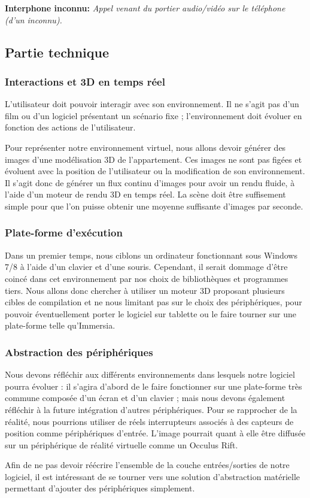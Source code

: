 \textbf{Interphone inconnu: } \textit{Appel venant du portier audio/vidéo sur le téléphone (d'un inconnu). }

\subsection{Partie technique}
\subsubsection{Interactions et 3D en temps réel}
L'utilisateur doit pouvoir interagir avec son environnement. Il ne s'agit pas d'un film ou d'un logiciel présentant un scénario fixe ; l'environnement doit évoluer en fonction des actions de l'utilisateur.

Pour représenter notre environnement virtuel, nous allons devoir générer des images d'une modélisation 3D de l'appartement. Ces images ne sont pas figées et évoluent avec la position de l'utilisateur ou la modification de son environnement. Il s'agit donc de générer un flux continu d'images pour avoir un rendu fluide, à l'aide d'un moteur de rendu 3D en temps réel. La scène doit être suffisement simple pour que l'on puisse obtenir une moyenne suffisante d'images par seconde.

\subsubsection{Plate-forme d'exécution}

Dans un premier temps, nous ciblons un ordinateur fonctionnant sous Windows 7/8 à l'aide d'un clavier et d'une souris. Cependant, il serait dommage d'être coincé dans cet environnement par nos choix de bibliothèques et programmes tiers. Nous allons donc chercher à utiliser un moteur 3D proposant plusieurs cibles de compilation et ne nous limitant pas sur le choix des périphériques, pour pouvoir éventuellement porter le logiciel sur tablette ou le faire tourner sur une plate-forme telle qu'Immersia.

\subsubsection{Abstraction des périphériques}

Nous devons réfléchir aux différents environnements dans lesquels notre logiciel pourra évoluer : il s'agira d'abord de le faire fonctionner sur une plate-forme très commune composée d'un écran et d'un clavier ; mais nous devons également réfléchir à la future intégration d'autres périphériques. Pour se rapprocher de la réalité, nous pourrions utiliser de réels interrupteurs associés à des capteurs de position comme périphériques d'entrée. L'image pourrait quant à elle être diffusée sur un périphérique de réalité virtuelle comme un Occulus Rift.

Afin de ne pas devoir réécrire l'ensemble de la couche entrées/sorties de notre logiciel, il est intéressant de se tourner vers une solution d'abstraction matérielle permettant d'ajouter des périphériques simplement.
